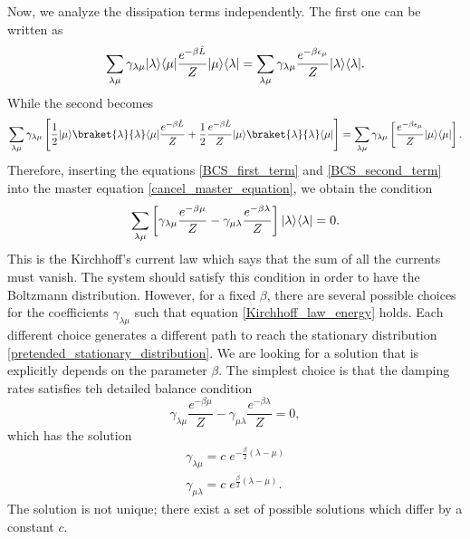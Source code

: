 Now, we analyze the dissipation terms independently.
The first one can be written as 
\begin{equation}\label{BCS_first_term}
        \sum_{\lambda\mu} \gamma_{\lambda\mu} \lvert\lambda\rangle\langle\mu\rvert\frac{e^{-\beta\hat L}}{Z} \lvert\mu\rangle\langle\lambda\rvert = 
        \sum_{\lambda\mu} \gamma_{\lambda\mu} \frac{e^{-\beta \epsilon_\mu}}{Z} \lvert\lambda\rangle\langle\lambda\rvert.
\end{equation}
While the second becomes
\begin{equation}\label{BCS_second_term}
    \sum_{\lambda\mu} \gamma_{\lambda\mu}\left[\frac{1}{2}\ket{\mu}\braket{\lambda}{\lambda}\bra{\mu}\frac{e^{-\beta\hat L}}{Z} +\frac{1}{2}\frac{e^{-\beta\hat L}}{Z}\ket{\mu}\braket{\lambda}{\lambda}\bra{\mu}\right]= \sum_{\lambda\mu} \gamma_{\lambda\mu}\left[\frac{e^{-\beta \epsilon_\mu}}{Z}\ket{\mu}\bra{\mu}\right].
\end{equation}
Therefore, inserting the equations \eqref{BCS_first_term} and \eqref{BCS_second_term} into the master equation \eqref{cancel_master_equation}, we obtain the condition
\begin{equation}\label{Kirchhoff_law_energy}
    \sum_{\lambda\mu}\left[\gamma_{\lambda\mu}\frac{e^{-\beta \mu}}{Z} - \gamma_{\mu\lambda}\frac{e^{-\beta \lambda}}{Z}\right]\lvert\lambda\rangle\langle\lambda\rvert = 0.
\end{equation}
This is the Kirchhoff's current law which says that the sum of all the currents must vanish. The system should satisfy this condition in order to have the Boltzmann distribution.
However, for a fixed $\beta$, there are several possible choices for the coefficients $\gamma_{\lambda\mu}$ such that equation \eqref{Kirchhoff_law_energy} holds.
Each different choice generates a different path to reach the stationary distribution \eqref{pretended_stationary_distribution}.
We are looking for a solution that is explicitly depends on the parameter $\beta$. The simplest choice is that the damping rates satisfies teh detailed balance condition 
\begin{equation}
    \gamma_{\lambda\mu}\frac{e^{-\beta \mu}}{Z} - \gamma_{\mu\lambda}\frac{e^{-\beta \lambda}}{Z} = 0,
\end{equation}
which has the solution
\begin{equation}\label{gamma_detailed_balance}
    \begin{split}
        \gamma_{\lambda\mu} = c \;e^{-\frac{\beta}{2}\left(\lambda - \mu\right)}\\
        \gamma_{\mu\lambda} = c \; e^{\frac{\beta}{2}\left(\lambda - \mu\right)}.
    \end{split}
\end{equation}
The solution is not unique;  there exist a set of possible solutions which differ by a constant $c$.

